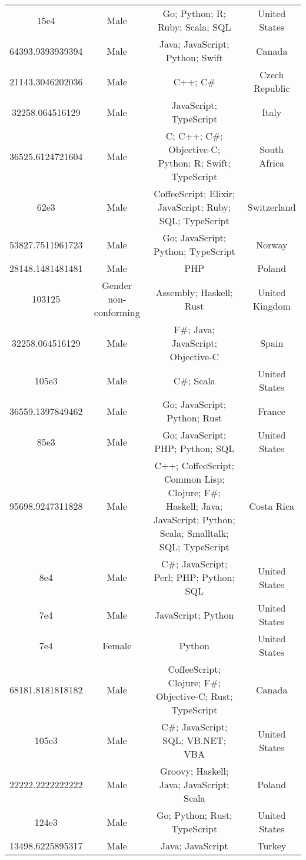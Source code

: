 \begin{center}
\begin{tabular}{ |c|c|c|c| }
15e4  &  Male  &  Go; Python; R; Ruby; Scala; SQL  &  United States  \\ 
64393.9393939394  &  Male  &  Java; JavaScript; Python; Swift  &  Canada  \\ 
21143.3046202036  &  Male  &  C++; C\#  &  Czech Republic  \\ 
32258.064516129  &  Male  &  JavaScript; TypeScript  &  Italy  \\ 
36525.6124721604  &  Male  &  C; C++; C\#; Objective-C; Python; R; Swift; TypeScript  &  South Africa  \\ 
62e3  &  Male  &  CoffeeScript; Elixir; JavaScript; Ruby; SQL; TypeScript  &  Switzerland  \\ 
53827.7511961723  &  Male  &  Go; JavaScript; Python; TypeScript  &  Norway  \\ 
28148.1481481481  &  Male  &  PHP  &  Poland  \\ 
103125  &  Gender non-conforming  &  Assembly; Haskell; Rust  &  United Kingdom  \\ 
32258.064516129  &  Male  &  F\#; Java; JavaScript; Objective-C  &  Spain  \\ 
105e3  &  Male  &  C\#; Scala  &  United States  \\ 
36559.1397849462  &  Male  &  Go; JavaScript; Python; Rust  &  France  \\ 
85e3  &  Male  &  Go; JavaScript; PHP; Python; SQL  &  United States  \\ 
95698.9247311828  &  Male  &  C++; CoffeeScript; Common Lisp; Clojure; F\#; Haskell; Java; JavaScript; Python; Scala; Smalltalk; SQL; TypeScript  &  Costa Rica  \\ 
8e4  &  Male  &  C\#; JavaScript; Perl; PHP; Python; SQL  &  United States  \\ 
7e4  &  Male  &  JavaScript; Python  &  United States  \\ 
7e4  &  Female  &  Python  &  United States  \\ 
68181.8181818182  &  Male  &  CoffeeScript; Clojure; F\#; Objective-C; Rust; TypeScript  &  Canada  \\ 
105e3  &  Male  &  C\#; JavaScript; SQL; VB.NET; VBA  &  United States  \\ 
22222.2222222222  &  Male  &  Groovy; Haskell; Java; JavaScript; Scala  &  Poland  \\ 
124e3  &  Male  &  Go; Python; Rust; TypeScript  &  United States  \\ 
13498.6225895317  &  Male  &  Java; JavaScript  &  Turkey  \\ 

\end{tabular}
\end{center}
